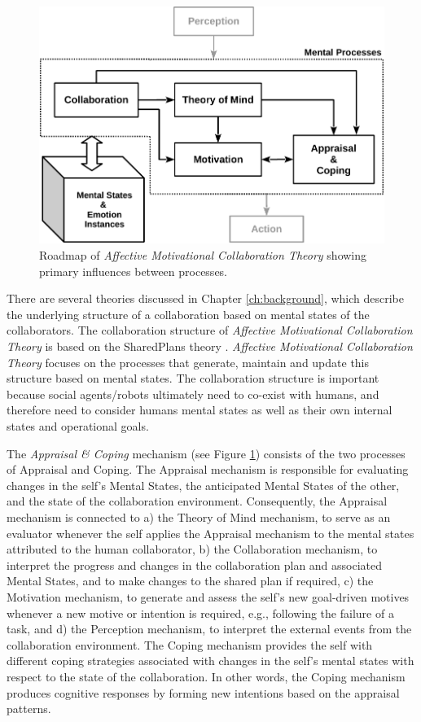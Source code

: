 \documentclass[12pt]{report}
\begin{document}
\begin{figure}[h!] 
  \centering
  \includegraphics[scale=1]{figure/theory-general-croped.pdf}
  \caption{Roadmap of \textit{Affective Motivational Collaboration Theory}
  showing primary influences between processes.}
  \label{fig:theory}
\end{figure}

There are several theories discussed in Chapter \ref{ch:background}, which
describe the underlying structure of a collaboration based on mental states of
the collaborators. The collaboration structure of \textit{Affective Motivational
Collaboration Theory} is based on the SharedPlans theory
\cite{grosz:shared-plans}. \textit{Affective Motivational Collaboration Theory}
focuses on the processes that generate, maintain and update this structure
based on mental states. The collaboration structure is important because social
agents/robots ultimately need to co-exist with humans, and therefore need to
consider humans mental states as well as their own internal states and
operational goals.

The \textit{Appraisal \& Coping} mechanism (see Figure \ref{fig:theory}) consists
of the two processes of Appraisal and Coping. The Appraisal mechanism is
responsible for evaluating changes in the self's Mental States, the anticipated
Mental States of the other, and the state of the collaboration environment.
Consequently, the Appraisal mechanism is connected to a) the Theory of Mind
mechanism, to serve as an evaluator whenever the self applies the Appraisal
mechanism to the mental states attributed to the human collaborator, b) the
Collaboration mechanism, to interpret the progress and changes in the
collaboration plan and associated Mental States, and to make changes to the
shared plan if required, c) the Motivation mechanism, to generate and assess the
self's new goal-driven motives whenever a new motive or intention is required,
e.g., following the failure of a task, and d) the Perception mechanism, to
interpret the external events from the collaboration environment. The Coping
mechanism provides the self with different coping strategies associated with
changes in the self's mental states with respect to the state of the
collaboration. In other words, the Coping mechanism produces cognitive responses
by forming new intentions based on the appraisal patterns.
\end{document}
